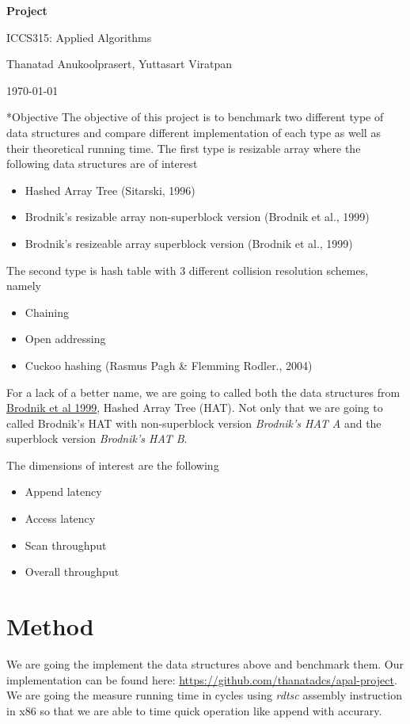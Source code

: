 \documentclass{article} %
\newcommand{\question}[2][]{\begin{flushleft}
                                \textbf{Question #1}: \textit{#2}

\end{flushleft}}
\newcommand{\maketitletwo}[2][]{\begin{center}
                                    \Large{\textbf{Project #1}

                                    ICCS315: Applied Algorithms} %
                                    \vspace{5pt}

                                    \normalsize{Thanatad Anukoolprasert, Yuttasart Viratpan   %

                                    \today}        %
                                    \vspace{15pt}
\end{center}}
\begin{document}
    \maketitletwo[]  %

    \section*{Objective}
    The objective of this project is to benchmark two different type of data structures and compare different
    implementation of each type as well as their theoretical running time.
    The first type is resizable array where the following data structures are of interest
    \begin{itemize}
        \item Hashed Array Tree (Sitarski, 1996)
        \item Brodnik's resizable array non-superblock version (Brodnik et al., 1999)
        \item Brodnik's resizeable array superblock version (Brodnik et al., 1999)
    \end{itemize}

    The second type is hash table with 3 different collision resolution schemes, namely
    \begin{itemize}
        \item Chaining
        \item Open addressing
        \item Cuckoo hashing (Rasmus Pagh \& Flemming Rodler., 2004)
    \end{itemize}

    For a lack of a better name, we are going to called both the data structures from \href{ https://sedgewick.io/wp-content/themes/sedgewick/papers/1999Optimal.pdf}{ Brodnik et al 1999}, Hashed Array Tree (HAT).
    Not only that we are going to called Brodnik's HAT with non-superblock version \emph{Brodnik's HAT A} and the superblock version \emph{Brodnik's HAT B}.

    The dimensions of interest are the following
    \begin{itemize}
        \item Append latency
        \item Access latency
        \item Scan throughput
        \item Overall throughput
    \end{itemize}

    \section*{Method}
    We are going the implement the data structures above and benchmark them. Our implementation can be found here: \href{https://github.com/thanatadcs/apal-project}{ https://github.com/thanatadcs/apal-project}.
    We are going the measure running time in cycles using
    \emph{rdtsc} assembly instruction in x86 so that we are able to time quick operation like append with accurary.
\end{document}
